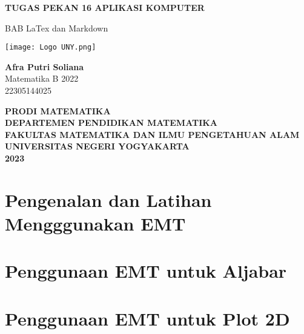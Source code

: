 \documentclass{report}
\begin{document}
\begin{titlepage}
    \begin{center}
        \vspace*{0,2cm}

        \Huge
        \textbf{TUGAS PEKAN 16 APLIKASI KOMPUTER}

        \vspace{1cm}

        \LARGE
        BAB LaTex dan Markdown

        \vspace{1cm}

        \texttt{[image: Logo UNY.png]}

        \vspace{1cm}

        \textbf{Afra Putri Soliana}\\Matematika B 2022\\22305144025

        \vspace{2cm}

        \Large
        \textbf{PRODI MATEMATIKA}\\
        \textbf{DEPARTEMEN PENDIDIKAN MATEMATIKA}\\
        \textbf{FAKULTAS MATEMATIKA DAN ILMU PENGETAHUAN ALAM}\\
        \textbf{UNIVERSITAS NEGERI YOGYAKARTA}\\
        \textbf{2023}

    \end{center}
\end{titlepage}

\newpage
\tableofcontents

\chapter{Pengenalan dan Latihan Mengggunakan EMT}


\newpage
\chapter{Penggunaan EMT untuk Aljabar}


\newpage
\chapter{Penggunaan EMT untuk Plot 2D}

\end{document}
